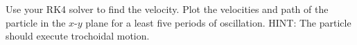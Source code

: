 \documentclass{article}
\begin{document}
\begin{enumerate}
\begin{itemize}
\begin{equation}
    \end{equation}
    Use your RK4 solver to find the velocity.  Plot the velocities and path of the particle in the $x$-$y$ plane for a least five periods of oscillation.  HINT:  The particle should execute trochoidal motion.  
  \end{itemize} 

\end{enumerate}
\end{document}
